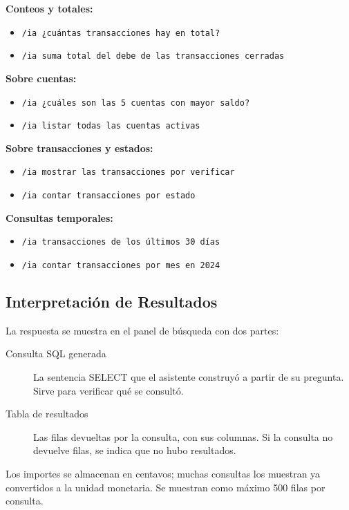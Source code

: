\textbf{Conteos y totales:}
\begin{itemize}
    \item \texttt{/ia ¿cuántas transacciones hay en total?}
    \item \texttt{/ia suma total del debe de las transacciones cerradas}
\end{itemize}

\textbf{Sobre cuentas:}
\begin{itemize}
    \item \texttt{/ia ¿cuáles son las 5 cuentas con mayor saldo?}
    \item \texttt{/ia listar todas las cuentas activas}
\end{itemize}

\textbf{Sobre transacciones y estados:}
\begin{itemize}
    \item \texttt{/ia mostrar las transacciones por verificar}
    \item \texttt{/ia contar transacciones por estado}
\end{itemize}

\textbf{Consultas temporales:}
\begin{itemize}
    \item \texttt{/ia transacciones de los últimos 30 días}
    \item \texttt{/ia contar transacciones por mes en 2024}
\end{itemize}

\subsection{Interpretación de Resultados}

La respuesta se muestra en el panel de búsqueda con dos partes:

\begin{description}
    \item[Consulta SQL generada] La sentencia SELECT que el asistente construyó a partir de su pregunta. Sirve para verificar qué se consultó.
    \item[Tabla de resultados] Las filas devueltas por la consulta, con sus columnas. Si la consulta no devuelve filas, se indica que no hubo resultados.
\end{description}

\begin{notebox}
Los importes se almacenan en centavos; muchas consultas los muestran ya convertidos a la unidad monetaria. Se muestran como máximo 500 filas por consulta.
\end{notebox}

